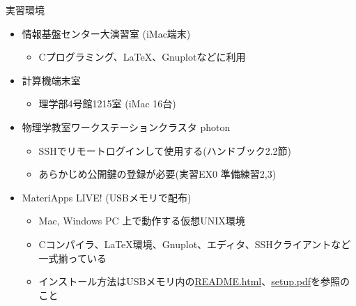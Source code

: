 \begin{frame}[t,fragile]{実習環境}
  \begin{itemize}
    \setlength{\itemsep}{1em}
  \item 情報基盤センター大演習室 (iMac端末)
    \begin{itemize}
    \item Cプログラミング、\LaTeX、Gnuplotなどに利用
    \end{itemize}
  \item 計算機端末室
    \begin{itemize}
    \item 理学部4号館1215室 (iMac 16台)
    \end{itemize}
  \item 物理学教室ワークステーションクラスタ photon
    \begin{itemize}
    \item SSHでリモートログインして使用する(ハンドブック2.2節)
    \item あらかじめ公開鍵の登録が必要(実習EX0 準備練習2,3)
    \end{itemize}
  \item MateriApps LIVE! (USBメモリで配布)
    \begin{itemize}
    \item Mac, Windows PC 上で動作する仮想UNIX環境
    \item Cコンパイラ、\LaTeX 環境、Gnuplot、エディタ、SSHクライアントなど一式揃っている
    \item インストール方法はUSBメモリ内の\href{https://github.com/cmsi/MateriAppsLive/wiki/MateriAppsLive-ltx}{README.html}、\href{https://github.com/cmsi/MateriAppsLive-setup/blob/master/ova/setup.pdf}{setup.pdf}を参照のこと
    \end{itemize}
  \end{itemize}
\end{frame}
